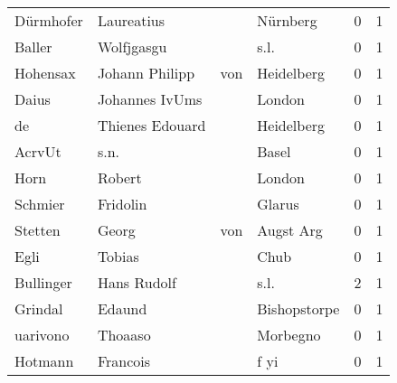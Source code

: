 \begin{tabular}{llllrr}
                Dürmhofer &                         Laureatius &             &                                    Nürnberg &          0 &         1 \\
                   Baller &                         Wolfjgasgu &             &                                        s.l. &          0 &         1 \\
                 Hohensax &                     Johann Philipp &         von &                                  Heidelberg &          0 &         1 \\
                    Daius &                     Johannes IvUms &             &                                      London &          0 &         1 \\
                       de &                    Thienes Edouard &             &                                  Heidelberg &          0 &         1 \\
                   AcrvUt &                               s.n. &             &                                       Basel &          0 &         1 \\
                     Horn &                             Robert &             &                                      London &          0 &         1 \\
                  Schmier &                           Fridolin &             &                                      Glarus &          0 &         1 \\
                  Stetten &                              Georg &         von &                                   Augst Arg &          0 &         1 \\
                     Egli &                             Tobias &             &                                        Chub &          0 &         1 \\
                Bullinger &                        Hans Rudolf &             &                                        s.l. &          2 &         1 \\
                  Grindal &                             Edaund &             &                                Bishopstorpe &          0 &         1 \\
                 uarivono &                            Thoaaso &             &                                    Morbegno &          0 &         1 \\
                  Hotmann &                           Francois &             &                                        f yi &          0 &         1 \\

\end{tabular}
